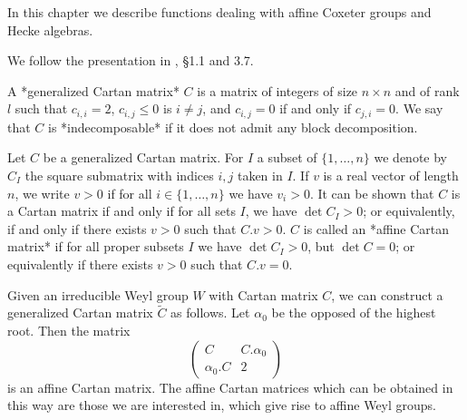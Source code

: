 

In this chapter we describe functions dealing with affine Coxeter  groups
and Hecke algebras.

We follow the presentation in \cite{Kac}, \S1.1 and 3.7.

A *generalized Cartan matrix* $C$ is a matrix of integers
of  size $n\times n$ and of rank  $l$ such that $c_{i,i}=2$, $c_{i,j}\le 0$
is $i\ne j$, and $c_{i,j}=0$ if and only if $c_{j,i}=0$. We say that $C$ is
*indecomposable* if it does not admit any block decomposition.

Let $C$ be a generalized Cartan matrix. For $I$ a subset of
$\{1,\ldots,n\}$ we denote by $C_I$ the square submatrix with indices $i,j$
taken  in $I$. If $v$ is a real vector of length $n$, we write $v>0$ if for
all  $i\in\{1,\ldots,n\}$ we have  $v_i>0$. It can  be shown that  $C$ is a
Cartan  matrix if and  only if for  all sets $I$,  we have $\det C_I>0$; or
equivalently,  if and only if there exists  $v>0$ such that $C.v>0$. $C$ is
called  an *affine  Cartan matrix*  if for  all proper  subsets $I$ we have
$\det  C_I>0$, but $\det  C=0$; or equivalently  if there exists $v>0$ such
that $C.v=0$.

Given  an  irreducible  Weyl  group  $W$  with  Cartan  matrix  $C$, we can
construct a generalized Cartan matrix $\tilde C$ as follows. Let $\alpha_0$
be the opposed of the highest root. Then the matrix $$\left
(\begin{array}{cc}C&C.\alpha_0\\  \alpha_0.C&2\end{array}\right  )$$  is an
affine  Cartan matrix. The affine Cartan  matrices which can be obtained in
this  way are those  we are interested  in, which give  rise to affine Weyl
groups.

